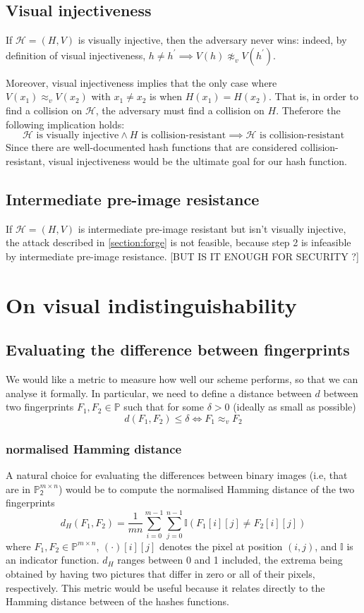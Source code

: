 \documentclass{article}
\newcommand{\bb}{\mathbb}
\newcommand{\pb}{\bb P _ \mathsf{2}}
\newcommand{\vis}{\approx_v}
\newcommand{\hh}{\mathcal H}
\begin{document}
\subsection{Visual injectiveness}
If $\hh = (H,V)$ is visually injective, then the adversary never wins: indeed, by definition of visual injectiveness, $h \neq h^\prime  \implies V(h) \not\vis V(h^\prime)$. 

Moreover, visual injectiveness implies that the only case where $V(x_1) \vis V(x_2)$ with $x_1 \neq x_2$ is when $H(x_1) = H(x_2)$. That is, in order to find a collision on $\hh$, the adversary must find a collision on $H$. Theferore the following implication holds:
\begin{equation}
    \hh \text{ is visually injective} \wedge H \text{ is collision-resistant} \implies \hh \text{ is collision-resistant}
\end{equation}
\label{eq:sparse}
Since there are well-documented hash functions that are considered collision-resistant, visual injectiveness would be the ultimate goal for our hash function. 

\subsection{Intermediate pre-image resistance}
If $\hh = (H,V)$ is intermediate pre-image resistant but isn't visually injective, the attack described in \cref{section:forge} is not feasible, because step 2 is infeasible by intermediate pre-image resistance. [BUT IS IT ENOUGH FOR SECURITY ?]


\section{On visual indistinguishability}
\subsection{Evaluating the difference between fingerprints}
We would like a metric to measure how well our scheme performs, so that we can analyse it formally. In particular, we need to define a distance between $d$ between two fingerprints $F_1,F_2 \in \bb P$ such that for some $\delta > 0$ (ideally as small as possible)
$$d(F_1,F_2) \leq \delta \iff F_1 \vis F_2$$

\subsubsection{normalised Hamming distance}
A natural choice for evaluating the differences between binary images (i.e, that are in $\pb^{m\times n}$) would be to compute the normalised Hamming distance of the two fingerprints
$$d_H(F_1,F_2) = \frac{1}{mn} \sum\limits_{i=0}^{m-1}\sum\limits_{j=0}^{n-1} \mathbb{I}(F_1[i][j] \neq F_2[i][j])$$ where $F_1, F_2 \in \mathbb{P}^{m \times n}$, $(\cdot)[i][j]$ denotes the pixel at position $(i,j)$, and $\mathbb I$ is an indicator function. $d_H$ ranges between 0 and 1 included, the extrema being obtained by having two pictures that differ in zero or all of their pixels, respectively. This metric would be useful because it relates directly to the Hamming distance between of the hashes functions.
\end{document}
